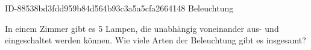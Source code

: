 \begin{exercise}
      {ID-88538bd3fdd959b84d564b93c3a5a5cfa2664148}
      {Beleuchtung}
  \ifproblem\problem\par
    In einem Zimmer gibt es 5 Lampen, die unabhängig voneinander aus- und
    eingeschaltet werden können. Wie viele Arten der Beleuchtung gibt es
    insgesamt?
  \fi
\end{exercise}
